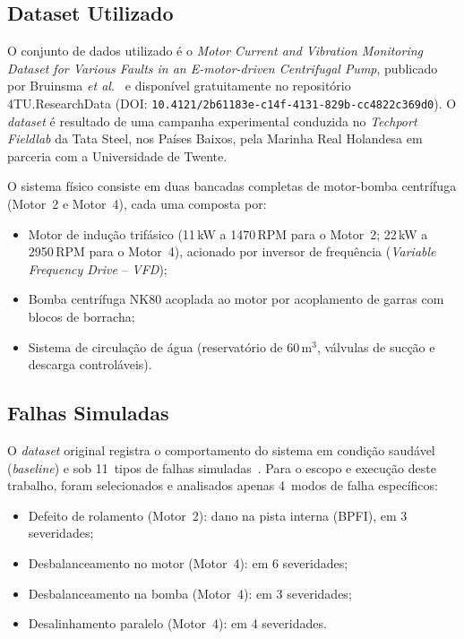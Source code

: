 \documentclass[conference]{IEEEtran}
\begin{document}
\subsection{Dataset Utilizado}

O conjunto de dados utilizado é o \textit{Motor Current and Vibration
Monitoring \textit{Dataset} for Various Faults in an E-motor-driven Centrifugal
Pump}, publicado por Bruinsma \textit{et al.}~\cite{bruinsma2024} e
disponível gratuitamente no repositório 4TU.ResearchData (DOI:
\texttt{10.4121/2b61183e-c14f-4131-829b-cc4822c369d0}). O \textit{dataset} é
resultado de uma campanha experimental conduzida no \textit{Techport Fieldlab}
da Tata Steel, nos Países Baixos, pela Marinha Real Holandesa em
parceria com a Universidade de Twente.

O sistema físico consiste em duas bancadas completas de motor-bomba
centrífuga (Motor~2 e Motor~4), cada uma composta por:

\begin{itemize}
    \item Motor de indução trifásico (11\,kW a 1470\,RPM para o
    Motor~2; 22\,kW a 2950\,RPM para o Motor~4), acionado por
    inversor de frequência (\textit{Variable Frequency Drive} -- \textit{VFD});
    \item Bomba centrífuga NK80 acoplada ao motor por acoplamento de
    garras com blocos de borracha;
    \item Sistema de circulação de água (reservatório de 60\,m$^3$,
    válvulas de sucção e descarga controláveis).
\end{itemize}

\subsection{Falhas Simuladas}

O \textit{dataset} original registra o comportamento do sistema em condição saudável
(\textit{baseline}) e sob 11~tipos de falhas simuladas~\cite{bruinsma2024}.
Para o escopo e execução deste trabalho, foram selecionados e analisados
apenas 4~modos de falha específicos:

\begin{itemize}
    \item Defeito de rolamento (Motor~2): dano na pista
    interna (BPFI), em 3 severidades;
    \item Desbalanceamento no motor (Motor~4): em 6 severidades;
    \item Desbalanceamento na bomba (Motor~4): em 3 severidades;
    \item Desalinhamento paralelo (Motor~4): em 4 severidades.
\end{itemize}
\end{document}
